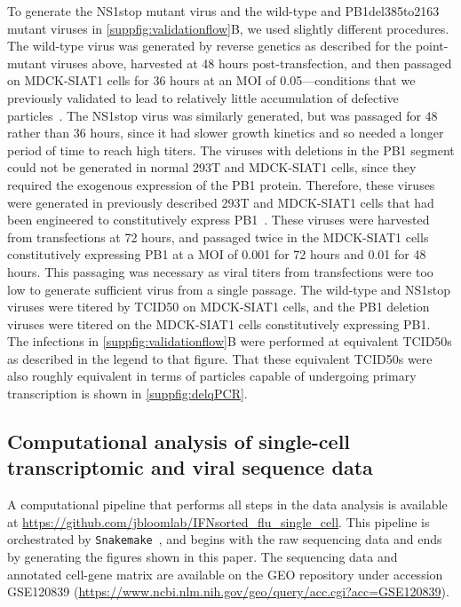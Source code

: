 \documentclass[10pt,letterpaper]{article}
\newcommand{\SUPPFIG}[1]{\autoref{suppfig:#1}}
\begin{document}
To generate the NS1stop mutant virus and the wild-type and PB1del385to2163 mutant viruses in \SUPPFIG{validationflow}B, we used slightly different procedures.
The wild-type virus was generated by reverse genetics as described for the point-mutant viruses above, harvested at 48 hours post-transfection, and then passaged on MDCK-SIAT1 cells for 36 hours at an MOI of 0.05---conditions that we previously validated to lead to relatively little accumulation of defective particles~\citep{russell2018extreme}.
The NS1stop virus was similarly generated, but was passaged for 48 rather than 36 hours, since it had slower growth kinetics and so needed a longer period of time to reach high titers.
The viruses with deletions in the PB1 segment could not be generated in normal 293T and MDCK-SIAT1 cells, since they required the exogenous expression of the PB1 protein.
Therefore, these viruses were generated in previously described 293T and MDCK-SIAT1 cells that had been engineered to constitutively express PB1~\citep{bloom2010permissive}.
These viruses were harvested from transfections at 72 hours, and passaged twice in the MDCK-SIAT1 cells constitutively expressing PB1 at a MOI of 0.001 for 72 hours and 0.01 for 48 hours. 
This passaging was necessary as viral titers from transfections were too low to generate sufficient virus from a single passage.
The wild-type and NS1stop viruses were titered by TCID50 on MDCK-SIAT1 cells, and the PB1 deletion viruses were titered on the MDCK-SIAT1 cells constitutively expressing PB1.
The infections in \SUPPFIG{validationflow}B were performed at equivalent TCID50s as described in the legend to that figure.
That these equivalent TCID50s were also roughly equivalent in terms of particles capable of undergoing primary transcription is shown in \SUPPFIG{delqPCR}.

\subsection*{Computational analysis of single-cell transcriptomic and viral sequence data}
A computational pipeline that performs all steps in the data analysis is available at \url{https://github.com/jbloomlab/IFNsorted_flu_single_cell}. 
This pipeline is orchestrated by \texttt{Snakemake}~\citep{koster2012snakemake}, and begins with the raw sequencing data and ends by generating the figures shown in this paper.
The sequencing data and annotated cell-gene matrix are available on the GEO repository under accession GSE120839 (\url{https://www.ncbi.nlm.nih.gov/geo/query/acc.cgi?acc=GSE120839}).
\end{document}
